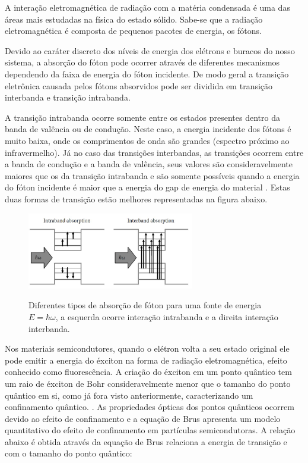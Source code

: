 \par A interação eletromagnética de radiação com a matéria condensada é uma das áreas mais estudadas na física do estado sólido. Sabe-se que a radiação eletromagnética é composta de pequenos pacotes de energia, os fótons\cite{bulk2}. 

\par Devido ao caráter discreto dos níveis de energia dos elétrons e buracos do nosso sistema, a absorção do fóton pode ocorrer através de diferentes mecanismos dependendo da faixa de energia do fóton incidente. De modo geral a transição eletrônica causada pelos fótons absorvidos pode ser dividida em transição interbanda e transição intrabanda\cite{bulk2}.

A transição intrabanda ocorre somente entre os estados presentes dentro da banda de valência ou de condução. Neste caso, a energia incidente dos fótons é muito baixa, onde os comprimentos de onda são grandes (espectro próximo ao infravermelho). Já no caso das transições interbandas, as transições ocorrem entre a banda de condução e a banda de valência, seus valores são consideravelmente maiores que os da transição intrabanda e são somente possíveis quando a energia do fóton incidente é maior que a energia do gap de energia do material \cite{bulk2}. Estas duas formas de transição estão melhores representadas na figura abaixo. 

\begin{figure}[H]
  \centering
  \caption{Diferentes tipos de absorção de fóton para uma fonte de energia $E=\hbar \omega$, a esquerda ocorre interação intrabanda e a direita interação interbanda\cite{bulk2}.}
  \includegraphics[width=0.65\textwidth]{images/figura16.jpg}
  \label{fig16}
\end{figure}


Nos materiais semicondutores, quando o elétron volta a seu estado original ele pode emitir a energia do éxciton na forma de radiação eletromagnética, efeito conhecido como fluorescência. A criação do éxciton em um ponto quântico tem um raio de éxciton de Bohr consideravelmente menor que o tamanho do ponto quântico em si, como já fora visto anteriormente, caracterizando um confinamento quântico. \cite{optica1}\cite{bulk2}. As propriedades ópticas dos pontos quânticos ocorrem devido ao efeito de confinamento e a equação de Brus apresenta um modelo quantitativo do efeito de confinamento em partículas semicondutoras. A relação abaixo é obtida através da equação de Brus relaciona a energia de transição e com o tamanho do ponto quântico:

